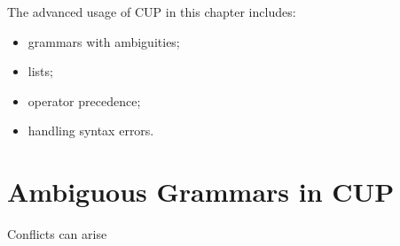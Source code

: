 The advanced usage of CUP in this chapter includes:
\begin{itemize}
	\item
	grammars with ambiguities;
	\item
	lists;
	\item
	operator precedence;
	\item
	handling syntax errors.
\end{itemize}

\section{Ambiguous Grammars in CUP}
Conflicts can arise
